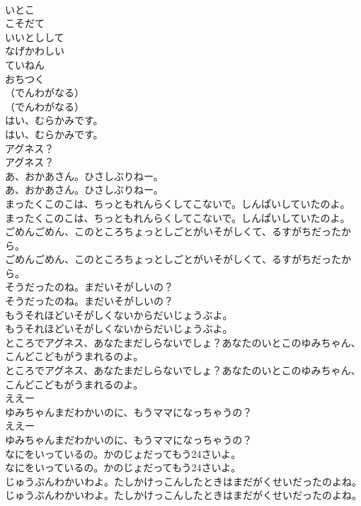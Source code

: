 \documentclass[8pt]{extreport}
\begin{document}
\begin{CJK}{UTF8}{min}
\\	いとこ
\\	こそだて
\\	いいとしして
\\	なげかわしい
\\	ていねん
\\	おちつく
\\	（でんわがなる）
\\	（でんわがなる）
\\	はい、むらかみです。
\\	はい、むらかみです。
\\	アグネス？
\\	アグネス？
\\	あ、おかあさん。ひさしぶりねー。
\\	あ、おかあさん。ひさしぶりねー。
\\	まったくこのこは、ちっともれんらくしてこないで。しんぱいしていたのよ。
\\	まったくこのこは、ちっともれんらくしてこないで。しんぱいしていたのよ。
\\	ごめんごめん、このところちょっとしごとがいそがしくて、るすがちだったから。
\\	ごめんごめん、このところちょっとしごとがいそがしくて、るすがちだったから。
\\	そうだったのね。まだいそがしいの？
\\	そうだったのね。まだいそがしいの？
\\	もうそれほどいそがしくないからだいじょうぶよ。
\\	もうそれほどいそがしくないからだいじょうぶよ。
\\	ところでアグネス、あなたまだしらないでしょ？あなたのいとこのゆみちゃん、こんどこどもがうまれるのよ。
\\	ところでアグネス、あなたまだしらないでしょ？あなたのいとこのゆみちゃん、こんどこどもがうまれるのよ。
\\	ええー
\\	ゆみちゃんまだわかいのに、もうママになっちゃうの？
\\	ええー
\\	ゆみちゃんまだわかいのに、もうママになっちゃうの？
\\	なにをいっているの。かのじょだってもう24さいよ。
\\	なにをいっているの。かのじょだってもう24さいよ。
\\	じゅうぶんわかいわよ。たしかけっこんしたときはまだがくせいだったのよね。
\\	じゅうぶんわかいわよ。たしかけっこんしたときはまだがくせいだったのよね。

\end{CJK}
\end{document}
